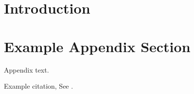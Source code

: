\documentclass[preprint,12pt,authoryear]{elsarticle}
\begin{document}
\begin{frontmatter}


\begin{keyword}



\end{keyword}

\end{frontmatter}



\section{Introduction}
\label{sec1}



\appendix
\section{Example Appendix Section}
\label{app1}

Appendix text.

Example citation, See \citet{lamport94}.

\end{document}
